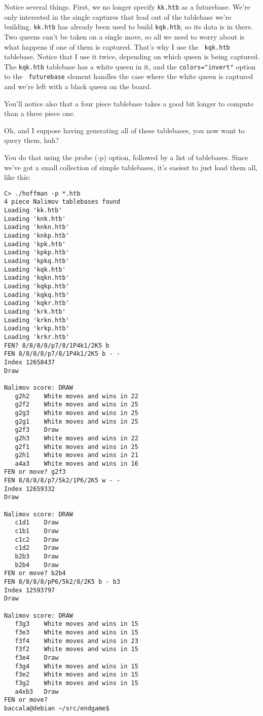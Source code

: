 \documentclass[11pt]{article}
\begin{document}
Notice several things.  First, we no longer specify {\tt kk.htb} as a
futurebase.  We're only interested in the single captures that lead
out of the tablebase we're building.  {\tt kk.htb} has already been
used to build {\tt kqk.htb}, so its data is in there.  Two queens
can't be taken on a single move, so all we need to worry about is what
happens if one of them is captured.  That's why I use the {\tt
kqk.htb} tablebase.  Notice that I use it twice, depending on which
queen is being captured.  The {\tt kqk.htb} tablebase has a white
queen in it, and the {\tt colors="invert"} option to the {\tt
futurebase} element handles the case where the white queen is captured
and we're left with a black queen on the board.

You'll notice also that a four piece tablebase takes a good bit longer
to compute than a three piece one.

Oh, and I suppose having generating all of these tablebases, you now
want to query them, huh?

You do that using the probe (-p) option, followed by a list of
tablebases.  Since we've got a small collection of simple tablebases,
it's easiest to just load them all, like this:

\begin{verbatim}
C> ./hoffman -p *.htb
4 piece Nalimov tablebases found
Loading 'kk.htb'
Loading 'knk.htb'
Loading 'knkn.htb'
Loading 'knkp.htb'
Loading 'kpk.htb'
Loading 'kpkp.htb'
Loading 'kpkq.htb'
Loading 'kqk.htb'
Loading 'kqkn.htb'
Loading 'kqkp.htb'
Loading 'kqkq.htb'
Loading 'kqkr.htb'
Loading 'krk.htb'
Loading 'krkn.htb'
Loading 'krkp.htb'
Loading 'krkr.htb'
FEN? 8/8/8/8/p7/8/1P4k1/2K5 b
FEN 8/8/8/8/p7/8/1P4k1/2K5 b - -
Index 12658437
Draw

Nalimov score: DRAW
   g2h2    White moves and wins in 22
   g2f2    White moves and wins in 25
   g2g3    White moves and wins in 25
   g2g1    White moves and wins in 25
   g2f3    Draw
   g2h3    White moves and wins in 22
   g2f1    White moves and wins in 25
   g2h1    White moves and wins in 21
   a4a3    White moves and wins in 16
FEN or move? g2f3
FEN 8/8/8/8/p7/5k2/1P6/2K5 w - -
Index 12659332
Draw

Nalimov score: DRAW
   c1d1    Draw
   c1b1    Draw
   c1c2    Draw
   c1d2    Draw
   b2b3    Draw
   b2b4    Draw
FEN or move? b2b4
FEN 8/8/8/8/pP6/5k2/8/2K5 b - b3
Index 12593797
Draw

Nalimov score: DRAW
   f3g3    White moves and wins in 15
   f3e3    White moves and wins in 15
   f3f4    White moves and wins in 23
   f3f2    White moves and wins in 15
   f3e4    Draw
   f3g4    White moves and wins in 15
   f3e2    White moves and wins in 15
   f3g2    White moves and wins in 15
   a4xb3   Draw
FEN or move?
baccala@debian ~/src/endgame$
\end{verbatim}
\end{document}
